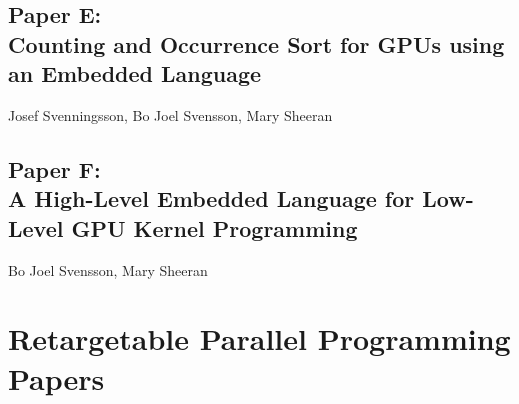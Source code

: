\documentclass[a4paper]{book}
\newcommand{\paperE}{Paper E}
\newcommand{\paperETitle}{Counting and Occurrence Sort for GPUs using an Embedded Language}
\newcommand{\paperF}{Paper F}
\newcommand{\paperFTitle}{A High-Level Embedded Language for Low-Level GPU Kernel Programming}
\begin{document}
% 
\cleardoublepage 

\section[\paperETitle]{\paperE: \\ \paperETitle}
\label{sec:paperE}


\begin{center} 
Josef Svenningsson, Bo Joel Svensson, Mary Sheeran 
\end{center}





% 
\cleardoublepage 


\section[\paperFTitle]{\paperF: \\ \paperFTitle}
\label{sec:paperF}




\begin{center} 
Bo Joel Svensson, Mary Sheeran
\end{center}








% 

\chapter{Retargetable Parallel Programming Papers}
\label{chap:ArBB}
% 
\cleardoublepage 
\end{document}
